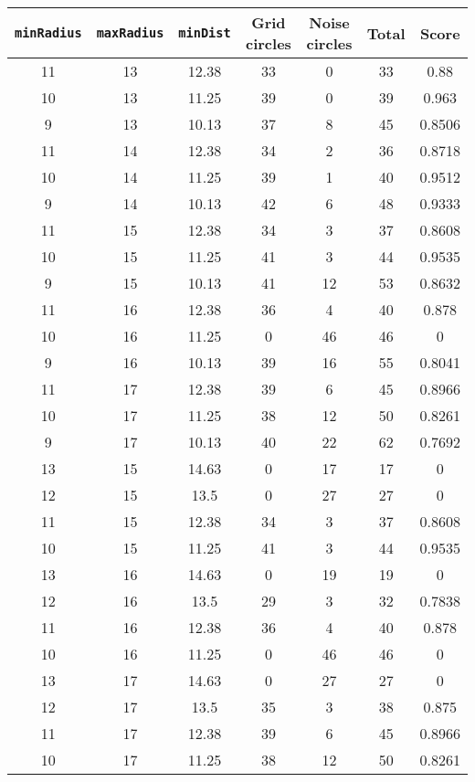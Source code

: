 \documentclass[letterpaper, 12pt]{article}
\begin{document}
\begin{longtable}{|c|c|c|c|c|c|c|}
\hline
\textbf{\texttt{minRadius}} & \textbf{\texttt{maxRadius}} & \textbf{\texttt{minDist}} & \textbf{Grid circles} & \textbf{Noise circles} & \textbf{Total} & \textbf{Score} \\
\hline
11 & 13 & 12.38 & 33 & 0 & 33 & 0.88 \\
\hline
10 & 13 & 11.25 & 39 & 0 & 39 & 0.963 \\
\hline
9 & 13 & 10.13 & 37 & 8 & 45 & 0.8506 \\
\hline
11 & 14 & 12.38 & 34 & 2 & 36 & 0.8718 \\
\hline
10 & 14 & 11.25 & 39 & 1 & 40 & 0.9512 \\
\hline
9 & 14 & 10.13 & 42 & 6 & 48 & 0.9333 \\
\hline
11 & 15 & 12.38 & 34 & 3 & 37 & 0.8608 \\
\hline
10 & 15 & 11.25 & 41 & 3 & 44 & 0.9535 \\
\hline
9 & 15 & 10.13 & 41 & 12 & 53 & 0.8632 \\
\hline
11 & 16 & 12.38 & 36 & 4 & 40 & 0.878 \\
\hline
10 & 16 & 11.25 & 0 & 46 & 46 & 0 \\
\hline
9 & 16 & 10.13 & 39 & 16 & 55 & 0.8041 \\
\hline
11 & 17 & 12.38 & 39 & 6 & 45 & 0.8966 \\
\hline
10 & 17 & 11.25 & 38 & 12 & 50 & 0.8261 \\
\hline
9 & 17 & 10.13 & 40 & 22 & 62 & 0.7692 \\
\hline
13 & 15 & 14.63 & 0 & 17 & 17 & 0 \\
\hline
12 & 15 & 13.5 & 0 & 27 & 27 & 0 \\
\hline
11 & 15 & 12.38 & 34 & 3 & 37 & 0.8608 \\
\hline
10 & 15 & 11.25 & 41 & 3 & 44 & 0.9535 \\
\hline
13 & 16 & 14.63 & 0 & 19 & 19 & 0 \\
\hline
12 & 16 & 13.5 & 29 & 3 & 32 & 0.7838 \\
\hline
11 & 16 & 12.38 & 36 & 4 & 40 & 0.878 \\
\hline
10 & 16 & 11.25 & 0 & 46 & 46 & 0 \\
\hline
13 & 17 & 14.63 & 0 & 27 & 27 & 0 \\
\hline
12 & 17 & 13.5 & 35 & 3 & 38 & 0.875 \\
\hline
11 & 17 & 12.38 & 39 & 6 & 45 & 0.8966 \\
\hline
10 & 17 & 11.25 & 38 & 12 & 50 & 0.8261 \\

\end{longtable}
\end{document}
